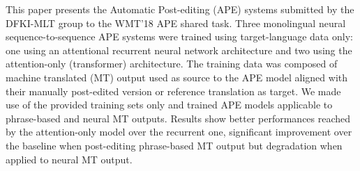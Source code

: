 This paper presents the Automatic Post-editing (APE) systems submitted by the DFKI-MLT group to the WMT'18 APE shared task. Three monolingual neural sequence-to-sequence APE systems were trained using target-language data only: one using an attentional recurrent neural network architecture and two using the attention-only (transformer) architecture. The training data was composed of machine translated (MT) output used as source to the APE model aligned with their manually post-edited version or reference translation as target. We made use of the provided training sets only and trained APE models applicable to phrase-based and neural MT outputs. Results show better performances reached by the attention-only model over the recurrent one, significant improvement over the baseline when post-editing phrase-based MT output but degradation when applied to neural MT output.
